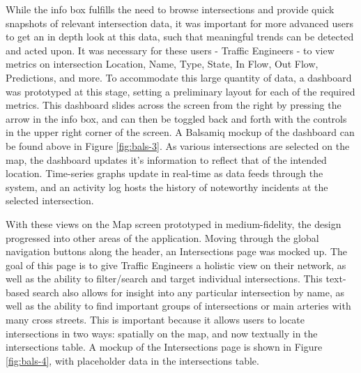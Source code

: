 \documentclass{report}
\begin{document}
While the info box fulfills the need to browse intersections and provide quick snapshots of relevant intersection data, it was important for more advanced users to get an in depth look at this data, such that meaningful trends can be detected and acted upon.
It was necessary for these users - Traffic Engineers - to view metrics on intersection Location, Name, Type, State, In Flow, Out Flow, Predictions, and more.
To accommodate this large quantity of data, a dashboard was prototyped at this stage, setting a preliminary layout for each of the required metrics.
This dashboard slides across the screen from the right by pressing the arrow in the info box, and can then be toggled back and forth with the controls in the upper right corner of the screen.
A Balsamiq mockup of the dashboard can be found above in Figure \ref{fig:bals-3}.
As various intersections are selected on the map, the dashboard updates it's information to reflect that of the intended location.
Time-series graphs update in real-time as data feeds through the system, and an activity log hosts the history of noteworthy incidents at the selected intersection.

With these views on the Map screen prototyped in medium-fidelity, the design progressed into other areas of the application.
Moving through the global navigation buttons along the header, an Intersections page was mocked up.
The goal of this page is to give Traffic Engineers a holistic view on their network, as well as the ability to filter/search and target individual intersections.
This text-based search also allows for insight into any particular intersection by name, as well as the ability to find important groups of intersections or main arteries with many cross streets.
This is important because it allows users to locate intersections in two ways: spatially on the map, and now textually in the intersections table.
A mockup of the Intersections page is shown in Figure \ref{fig:bals-4}, with placeholder data in the intersections table. \\
\end{document}
